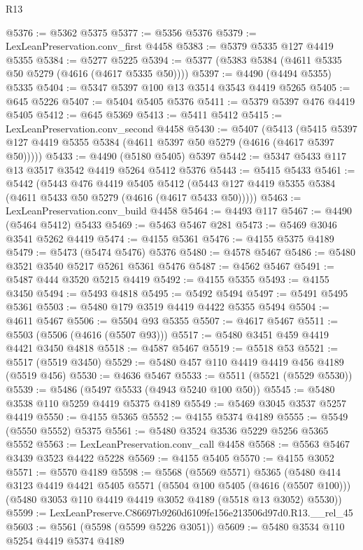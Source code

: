 \begin{lexlean}{R13}
\begin{coremodule}
@5376 := @5362 @5375
@5377 := @5356 @5376
@5379 := LexLeanPreservation.conv_first @4458
@5383 := @5379 @5335 @127 @4419 @5355
@5384 := @5277 @5225
@5394 := @5377 (@5383 @5384 (@4611 @5335 @50 @5279 (@4616 (@4617 @5335 @50))))
@5397 := @4490 (@4494 @5355) @5335
@5404 := @5347 @5397 @100 @13 @3514 @3543 @4419 @5265
@5405 := @645 @5226
@5407 := @5404 @5405 @5376
@5411 := @5379 @5397 @476 @4419 @5405
@5412 := @645 @5369
@5413 := @5411 @5412
@5415 := LexLeanPreservation.conv_second @4458
@5430 := @5407
    (@5413 (@5415 @5397 @127 @4419 @5355 @5384 (@4611 @5397 @50 @5279 (@4616 (@4617 @5397 @50)))))
@5433 := @4490 (@5180 @5405) @5397
@5442 := @5347 @5433 @117 @13 @3517 @3542 @4419 @5264 @5412 @5376
@5443 := @5415 @5433
@5461 := @5442
    (@5443
      @476
      @4419
      @5405
      @5412
      (@5443 @127 @4419 @5355 @5384 (@4611 @5433 @50 @5279 (@4616 (@4617 @5433 @50)))))
@5463 := LexLeanPreservation.conv_build @4458
@5464 := @4493 @117
@5467 := @4490 (@5464 @5412) @5433
@5469 := @5463 @5467 @281
@5473 := @5469 @3046 @3541 @5262 @4419
@5474 := @4155 @5361
@5476 := @4155 @5375 @4189
@5479 := @5473 (@5474 @5476) @5376
@5480 := @4578 @5467
@5486 := @5480 @3521 @3540 @5217 @5261 @5361 @5476
@5487 := @4562 @5467
@5491 := @5487 @444 @3520 @5215 @4419
@5492 := @4155 @5355
@5493 := @4155 @3450
@5494 := @5493 @4818
@5495 := @5492 @5494
@5497 := @5491 @5495 @5361
@5503 := @5480 @179 @3519 @4419 @4422 @5355 @5494
@5504 := @4611 @5467
@5506 := @5504 @93 @5355
@5507 := @4617 @5467
@5511 := @5503 (@5506 (@4616 (@5507 @93)))
@5517 := @5480 @3451 @459 @4419 @4421 @3450 @4818
@5518 := @4587 @5467
@5519 := @5518 @53
@5521 := @5517 (@5519 @3450)
@5529 := @5480 @457 @110 @4419 @4419 @456 @4189 (@5519 @456)
@5530 := @4636 @5467
@5533 := @5511 (@5521 (@5529 @5530))
@5539 := @5486 (@5497 @5533 (@4943 @5240 @100 @50))
@5545 := @5480 @3538 @110 @5259 @4419 @5375 @4189
@5549 := @5469 @3045 @3537 @5257 @4419
@5550 := @4155 @5365
@5552 := @4155 @5374 @4189
@5555 := @5549 (@5550 @5552) @5375
@5561 := @5480 @3524 @3536 @5229 @5256 @5365 @5552
@5563 := LexLeanPreservation.conv_call @4458
@5568 := @5563 @5467 @3439 @3523 @4422 @5228
@5569 := @4155 @5405
@5570 := @4155 @3052
@5571 := @5570 @4189
@5598 := @5568
    (@5569 @5571)
    @5365
    (@5480
      @414
      @3123
      @4419
      @4421
      @5405
      @5571
      (@5504 @100 @5405 (@4616 (@5507 @100)))
      (@5480 @3053 @110 @4419 @4419 @3052 @4189 (@5518 @13 @3052) @5530))
@5599 := LexLeanPreserve.C86697b9260d6109fe156e213506d97d0.R13.__rel_45
@5603 := @5561 (@5598 (@5599 @5226 @3051))
@5609 := @5480 @3534 @110 @5254 @4419 @5374 @4189

\end{coremodule}
\end{lexlean}
